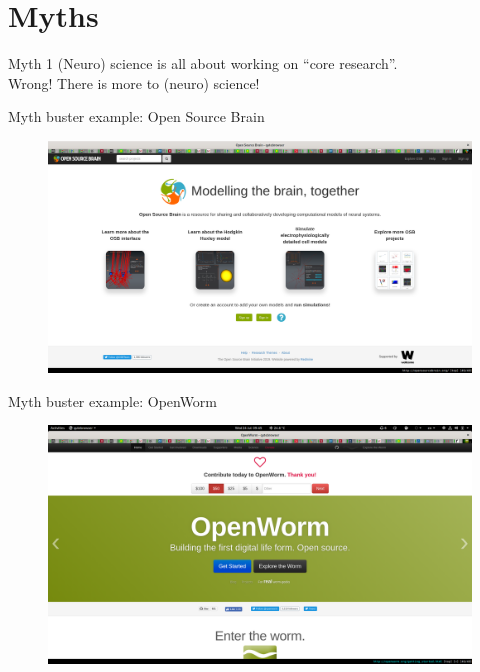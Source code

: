 \section{Myths}
\begin{frame}[c]{Myth 1}
  \textcolor{FriendsMagenta}{(Neuro) science is all about working on \enquote{core research}.}\\
  \vspace{0.5cm}
  \pause{}
  \textcolor{FirstGreen}{Wrong! There is more to (neuro) science!}\\
\end{frame}
\begin{frame}[c]{Myth buster example: Open Source Brain}
  \begin{figure}[h]
    \centering
    \includegraphics[width=\linewidth]{images/OSB.png}
  \end{figure}
\end{frame}
\begin{frame}[c]{Myth buster example: OpenWorm }
  \begin{figure}[h]
    \centering
    \includegraphics[width=\linewidth]{images/openworm.png}
  \end{figure}
\end{frame}
